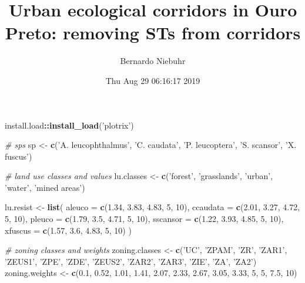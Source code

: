 \documentclass[]{article}
\title{Urban ecological corridors in Ouro Preto: removing STs from corridors}
\author{Bernardo Niebuhr}
\date{Thu Aug 29 06:16:17 2019}
\newenvironment{Shaded}{\begin{snugshade}}{\end{snugshade}}
\newcommand{\CommentTok}[1]{\textcolor[rgb]{0.56,0.35,0.01}{\textit{#1}}}
\newcommand{\DataTypeTok}[1]{\textcolor[rgb]{0.13,0.29,0.53}{#1}}
\newcommand{\DecValTok}[1]{\textcolor[rgb]{0.00,0.00,0.81}{#1}}
\newcommand{\FloatTok}[1]{\textcolor[rgb]{0.00,0.00,0.81}{#1}}
\newcommand{\KeywordTok}[1]{\textcolor[rgb]{0.13,0.29,0.53}{\textbf{#1}}}
\newcommand{\NormalTok}[1]{#1}
\newcommand{\OperatorTok}[1]{\textcolor[rgb]{0.81,0.36,0.00}{\textbf{#1}}}
\newcommand{\StringTok}[1]{\textcolor[rgb]{0.31,0.60,0.02}{#1}}
\begin{document}
\maketitle

\begin{Shaded}
\begin{Highlighting}[]
\NormalTok{install.load}\OperatorTok{::}\KeywordTok{install_load}\NormalTok{(}\StringTok{'plotrix'}\NormalTok{)}

\CommentTok{# sps}
\NormalTok{sp <-}\StringTok{ }\KeywordTok{c}\NormalTok{(}\StringTok{'A. leucophthalmus'}\NormalTok{, }\StringTok{'C. caudata'}\NormalTok{, }\StringTok{'P. leucoptera'}\NormalTok{, }\StringTok{'S. scansor'}\NormalTok{, }\StringTok{'X. fuscus'}\NormalTok{)}

\CommentTok{# land use classes and values}
\NormalTok{lu.classes <-}\StringTok{ }\KeywordTok{c}\NormalTok{(}\StringTok{'forest'}\NormalTok{, }\StringTok{'grasslands'}\NormalTok{, }\StringTok{'urban'}\NormalTok{, }\StringTok{'water'}\NormalTok{, }\StringTok{'mined areas'}\NormalTok{)}

\NormalTok{lu.resist <-}\StringTok{ }\KeywordTok{list}\NormalTok{(}
  \DataTypeTok{aleuco =} \KeywordTok{c}\NormalTok{(}\FloatTok{1.34}\NormalTok{, }\FloatTok{3.83}\NormalTok{, }\FloatTok{4.83}\NormalTok{, }\DecValTok{5}\NormalTok{, }\DecValTok{10}\NormalTok{),}
  \DataTypeTok{ccaudata =} \KeywordTok{c}\NormalTok{(}\FloatTok{2.01}\NormalTok{, }\FloatTok{3.27}\NormalTok{, }\FloatTok{4.72}\NormalTok{, }\DecValTok{5}\NormalTok{, }\DecValTok{10}\NormalTok{),}
  \DataTypeTok{pleuco =} \KeywordTok{c}\NormalTok{(}\FloatTok{1.79}\NormalTok{, }\FloatTok{3.5}\NormalTok{, }\FloatTok{4.71}\NormalTok{, }\DecValTok{5}\NormalTok{, }\DecValTok{10}\NormalTok{),}
  \DataTypeTok{sscansor =} \KeywordTok{c}\NormalTok{(}\FloatTok{1.22}\NormalTok{, }\FloatTok{3.93}\NormalTok{, }\FloatTok{4.85}\NormalTok{, }\DecValTok{5}\NormalTok{, }\DecValTok{10}\NormalTok{),}
  \DataTypeTok{xfuscus =} \KeywordTok{c}\NormalTok{(}\FloatTok{1.57}\NormalTok{, }\FloatTok{3.6}\NormalTok{, }\FloatTok{4.83}\NormalTok{, }\DecValTok{5}\NormalTok{, }\DecValTok{10}\NormalTok{)}
\NormalTok{)}

\CommentTok{# zoning classes and weights}
\NormalTok{zoning.classes <-}\StringTok{ }\KeywordTok{c}\NormalTok{(}\StringTok{'UC'}\NormalTok{, }\StringTok{'ZPAM'}\NormalTok{, }\StringTok{'ZR'}\NormalTok{, }\StringTok{'ZAR1'}\NormalTok{, }\StringTok{'ZEUS1'}\NormalTok{, }\StringTok{'ZPE'}\NormalTok{, }\StringTok{'ZDE'}\NormalTok{, }\StringTok{'ZEUS2'}\NormalTok{, }\StringTok{'ZAR2'}\NormalTok{, }\StringTok{'ZAR3'}\NormalTok{, }\StringTok{'ZIE'}\NormalTok{, }\StringTok{'ZA'}\NormalTok{, }\StringTok{'ZA2'}\NormalTok{)}
\NormalTok{zoning.weights <-}\StringTok{ }\KeywordTok{c}\NormalTok{(}\FloatTok{0.1}\NormalTok{, }\FloatTok{0.52}\NormalTok{, }\FloatTok{1.01}\NormalTok{, }\FloatTok{1.41}\NormalTok{, }\FloatTok{2.07}\NormalTok{, }\FloatTok{2.33}\NormalTok{, }\FloatTok{2.67}\NormalTok{, }\FloatTok{3.05}\NormalTok{, }\FloatTok{3.33}\NormalTok{, }\DecValTok{5}\NormalTok{, }\DecValTok{5}\NormalTok{, }\FloatTok{7.5}\NormalTok{, }\DecValTok{10}\NormalTok{)}
\end{Highlighting}
\end{Shaded}
\end{document}
